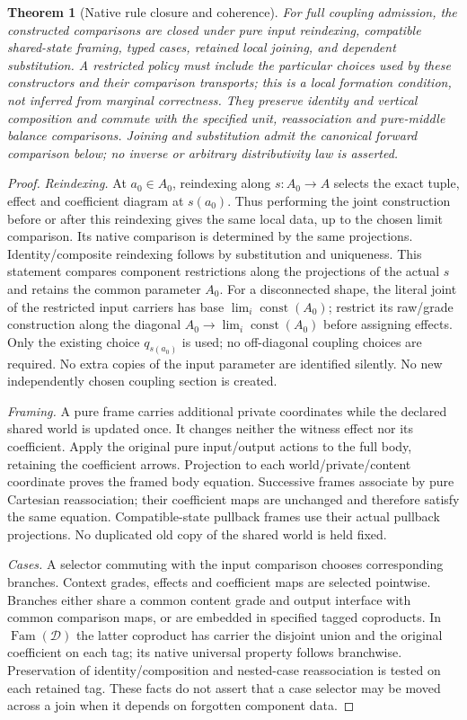 \documentclass[11pt]{article}
\newtheorem{theorem}{Theorem}
\begin{document}
\begin{theorem}[Native rule closure and coherence]\label{thm:graded-rules}
For full coupling admission, the constructed comparisons are closed under pure input reindexing, compatible shared-state framing, typed cases, retained local joining, and dependent substitution. A restricted policy must include the particular choices used by these constructors and their comparison transports; this is a local formation condition, not inferred from marginal correctness. They preserve identity and vertical composition and commute with the specified unit, reassociation and pure-middle balance comparisons. Joining and substitution admit the canonical forward comparison below; no inverse or arbitrary distributivity law is asserted.
\end{theorem}
\begin{proof}
\emph{Reindexing.} At $a_0\in A_0$, reindexing along $s:A_0\to A$ selects the exact tuple, effect and coefficient diagram at $s(a_0)$. Thus performing the joint construction before or after this reindexing gives the same local data, up to the chosen limit comparison. Its native comparison is determined by the same projections. Identity/composite reindexing follows by substitution and uniqueness. This statement compares component restrictions along the projections of the actual $s$ and retains the common parameter $A_0$. For a disconnected shape, the literal joint of the restricted input carriers has base $\lim_i\operatorname{const}(A_0)$; restrict its raw/grade construction along the diagonal $A_0\to\lim_i\operatorname{const}(A_0)$ before assigning effects. Only the existing choice $q_{s(a_0)}$ is used; no off-diagonal coupling choices are required. No extra copies of the input parameter are identified silently. No new independently chosen coupling section is created.

\emph{Framing.} A pure frame carries additional private coordinates while the declared shared world is updated once. It changes neither the witness effect nor its coefficient. Apply the original pure input/output actions to the full body, retaining the coefficient arrows. Projection to each world/private/content coordinate proves the framed body equation. Successive frames associate by pure Cartesian reassociation; their coefficient maps are unchanged and therefore satisfy the same equation. Compatible-state pullback frames use their actual pullback projections. No duplicated old copy of the shared world is held fixed.

\emph{Cases.} A selector commuting with the input comparison chooses corresponding branches. Context grades, effects and coefficient maps are selected pointwise. Branches either share a common content grade and output interface with common comparison maps, or are embedded in specified tagged coproducts. In $\operatorname{Fam}(\mathcal D)$ the latter coproduct has carrier the disjoint union and the original coefficient on each tag; its native universal property follows branchwise. Preservation of identity/composition and nested-case reassociation is tested on each retained tag. These facts do not assert that a case selector may be moved across a join when it depends on forgotten component data.


\end{proof}
\end{document}
